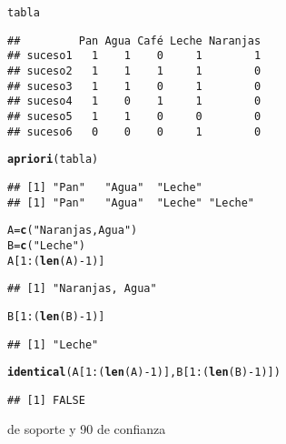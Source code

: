 \documentclass[12pt]{report}\usepackage[]{graphicx}\usepackage[dvipsnames]{xcolor}
\makeatletter
\newcommand{\hlnum}[1]{\textcolor[rgb]{0.686,0.059,0.569}{#1}}%
\newcommand{\hlstr}[1]{\textcolor[rgb]{0.192,0.494,0.8}{#1}}%
\newcommand{\hlopt}[1]{\textcolor[rgb]{0,0,0}{#1}}%
\newcommand{\hlstd}[1]{\textcolor[rgb]{0.345,0.345,0.345}{#1}}%
\newcommand{\hlkwb}[1]{\textcolor[rgb]{0.69,0.353,0.396}{#1}}%
\newcommand{\hlkwd}[1]{\textcolor[rgb]{0.737,0.353,0.396}{\textbf{#1}}}%
\newenvironment{kframe}{%
 \def\at@end@of@kframe{}%
 \ifinner\ifhmode%
  \def\at@end@of@kframe{\end{minipage}}%
  \begin{minipage}{\columnwidth}%
 \fi\fi%
 \def\FrameCommand##1{\hskip\@totalleftmargin \hskip-\fboxsep
 \colorbox{shadecolor}{##1}\hskip-\fboxsep
     \hskip-\linewidth \hskip-\@totalleftmargin \hskip\columnwidth}%
 \MakeFramed {\advance\hsize-\width
   \@totalleftmargin\z@ \linewidth\hsize
   \@setminipage}}%
 {\par\unskip\endMakeFramed%
 \at@end@of@kframe}
\newenvironment{knitrout}{}{} %
\makeatother
\begin{document}
\begin{knitrout}
\begin{kframe}
\begin{alltt}
\hlstd{tabla}
\end{alltt}
\begin{verbatim}
##         Pan Agua Café Leche Naranjas
## suceso1   1    1    0     1        1
## suceso2   1    1    1     1        0
## suceso3   1    1    0     1        0
## suceso4   1    0    1     1        0
## suceso5   1    1    0     0        0
## suceso6   0    0    0     1        0
\end{verbatim}
\begin{alltt}
\hlkwd{apriori}\hlstd{(tabla)}
\end{alltt}
\begin{verbatim}
## [1] "Pan"   "Agua"  "Leche"
## [1] "Pan"   "Agua"  "Leche" "Leche"
\end{verbatim}
\begin{alltt}
\hlstd{A} \hlkwb{=} \hlkwd{c}\hlstd{(}\hlstr{"Naranjas, Agua"}\hlstd{)}
\hlstd{B} \hlkwb{=} \hlkwd{c}\hlstd{(}\hlstr{"Leche"}\hlstd{)}
\hlstd{A[}\hlnum{1}\hlopt{:}\hlstd{(}\hlkwd{len}\hlstd{(A)}\hlopt{-}\hlnum{1}\hlstd{)]}
\end{alltt}
\begin{verbatim}
## [1] "Naranjas, Agua"
\end{verbatim}
\begin{alltt}
\hlstd{B[}\hlnum{1}\hlopt{:}\hlstd{(}\hlkwd{len}\hlstd{(B)}\hlopt{-}\hlnum{1}\hlstd{)]}
\end{alltt}
\begin{verbatim}
## [1] "Leche"
\end{verbatim}
\begin{alltt}
\hlkwd{identical}\hlstd{(A[}\hlnum{1}\hlopt{:}\hlstd{(}\hlkwd{len}\hlstd{(A)}\hlopt{-}\hlnum{1}\hlstd{)], B[}\hlnum{1}\hlopt{:}\hlstd{(}\hlkwd{len}\hlstd{(B)}\hlopt{-}\hlnum{1}\hlstd{)])}
\end{alltt}
\begin{verbatim}
## [1] FALSE
\end{verbatim}
\end{kframe}
\end{knitrout}
40 de soporte y 90 de confianza
\end{document}
